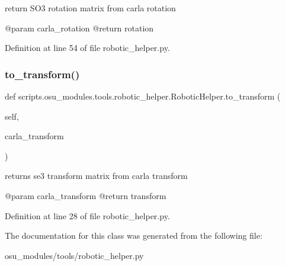 \begin{DoxyVerb}return SO3 rotation matrix from carla rotation

    @param carla_rotation
    @return rotation
\end{DoxyVerb}
 

Definition at line 54 of file robotic\+\_\+helper.\+py.

\mbox{\label{classscripts_1_1osu__modules_1_1tools_1_1robotic__helper_1_1RoboticHelper_a4e20b6e0ee95e19dfffd04f8124bc8c0}} 
\subsubsection{\texorpdfstring{to\+\_\+transform()}{to\_transform()}}
{\footnotesize\ttfamily def scripts.\+osu\+\_\+modules.\+tools.\+robotic\+\_\+helper.\+Robotic\+Helper.\+to\+\_\+transform (\begin{DoxyParamCaption}\item[{}]{self,  }\item[{}]{carla\+\_\+transform }\end{DoxyParamCaption})}

\begin{DoxyVerb}returns se3 transform matrix from carla transform

    @param carla_transform
    @return transform
\end{DoxyVerb}
 

Definition at line 28 of file robotic\+\_\+helper.\+py.



The documentation for this class was generated from the following file\+:\begin{DoxyCompactItemize}
\item 
osu\+\_\+modules/tools/robotic\+\_\+helper.\+py\end{DoxyCompactItemize}
